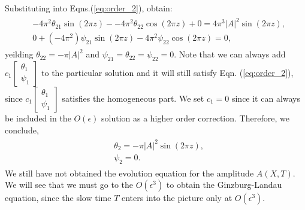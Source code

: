 \documentclass{article}
\begin{document}
Substituting into Eqns.(\ref{eq:order_2}), obtain:
\begin{align}
 \begin{split}
 & -4\pi^{2}\theta_{21} \sin{(2 \pi z)} -  -4\pi^{2}\theta_{22} \cos{(2 \pi z)} + 0 =  4 \pi^{3} |A|^{2} \sin{(2 \pi z)}, \\
 & 0 + (-4\pi^{2})\psi_{21} \sin{(2 \pi z)} - 4\pi^{2} \psi_{22} \cos{(2 \pi z)} = 0,
 \end{split}
\end{align}
yeilding $\theta_{22} = -\pi |A|^{2}$ and $\psi_{21} = \theta_{22} = \psi_{22} = 0$. Note that we can always add 
$c_{1}\begin{bmatrix}\theta_{1} \\                                                                                                    \psi_{1}                                                                                                    \end{bmatrix}$ to the particular solution and it will still satisfy Eqn. (\ref{eq:order_2}), since $c_{1}\begin{bmatrix}\theta_{1} \\                                                                                                    \psi_{1}                                                                                                    \end{bmatrix}$ satisfies the homogeneous part. We set $c_{1} = 0$ since it can always be included in the $O(\epsilon)$ solution as a higher order correction. 
Therefore, we conclude,
\begin{align}\label{eq:order_2_soln}
 \begin{split}
  & \boxed{\theta_{2} = -\pi |A|^{2} \sin{(2 \pi z)} },\\
  &\boxed{\psi_{2} = 0}.
 \end{split}
\end{align}
We still have not obtained the evolution equation for the amplitude $A(X, T)$. We will see that we must go to the $O(\epsilon^{3})$ to obtain the Ginzburg-Landau equation, since the slow time $T$ enters into the picture only at $O(\epsilon^{3})$.
\end{document}
